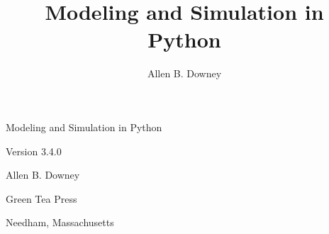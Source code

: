\documentclass[12pt]{book}
\title{Modeling and Simulation in Python}
\author{Allen B. Downey}
\newcommand{\thetitle}{Modeling and Simulation in Python}
\newcommand{\theauthors}{Allen B. Downey}
\newcommand{\theversion}{3.4.0}
\theoremstyle{exercise}
\newcommand\blankpage{%
    \null
    \thispagestyle{empty}%
    \addtocounter{page}{-1}%
    \newpage}
\newif\ifplastex
\begin{document}
\frontmatter

\ifplastex

\maketitle

\else

\begin{latexonly}

%
%
%
%
%
%




\pagebreak
\thispagestyle{empty}

\begin{flushright}
\vspace*{2.0in}

\begin{spacing}{3}
{\huge \thetitle}
\end{spacing}

\vspace{0.25in}

Version \theversion

\vspace{1in}


{\Large
\theauthors \\
}


\vspace{0.5in}

{\Large Green Tea Press}

{\small Needham, Massachusetts}

\vfill

\end{flushright}




\end{latexonly}
\end{document}
